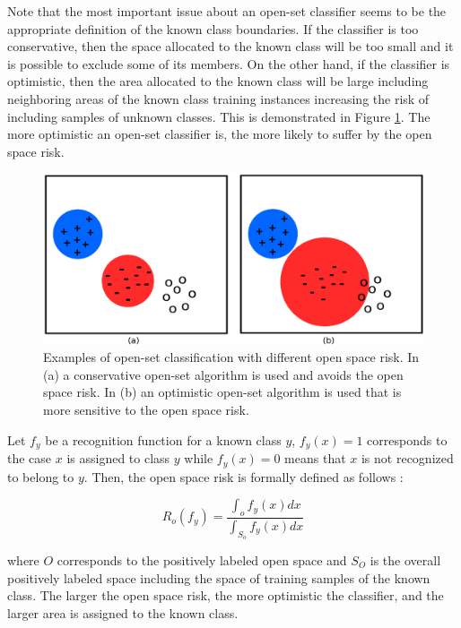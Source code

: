 Note that the most important issue about an open-set classifier seems to be the appropriate definition of the known class boundaries. If the classifier is too conservative, then the space allocated to the known class will be too small and it is possible to exclude some of its members. On the other hand, if the classifier is optimistic, then the area allocated to the known class will be large including neighboring areas of the known class training instances increasing the risk of including samples of unknown classes. This is demonstrated in Figure \ref{chap:openset:fig:open_space_risk_schema}. The more optimistic an open-set classifier is, the more likely to suffer by the open space risk.

\begin{figure}[t]
	\begin{center}
    	\includegraphics[scale=0.70]{Figures/open_space_risk_schema.eps}
		\caption{Examples of open-set classification with different open space risk. In (a) a conservative open-set algorithm is used and avoids the open space risk. In (b) an optimistic open-set algorithm is used that is more sensitive to the open space risk.}
		\label{chap:openset:fig:open_space_risk_schema}
	\end{center}
\end{figure}


Let $f_y$ be a recognition function for a known class $y$, $f_y(x)=1$ corresponds to the case $x$ is assigned to class $y$ while $f_y(x)=0$ means that $x$ is not recognized to belong to $y$. Then, the open space risk is formally defined as follows \parencite{scheirer2013toward}:

\begin{equation}\label{chap:eval_methods:eq:the_original_open_space_risk}
	R_{o}(f_y) = \frac{\int_{o} f_y(x) dx}{\int_{S_{o}}  f_y(x) dx}
\end{equation}

\noindent
where $O$ corresponds to the positively labeled open space and $S_O$ is the overall positively labeled space including the space of training samples of the known class. The larger the open space risk, the more optimistic the classifier, and the larger area is assigned to the known class.  

